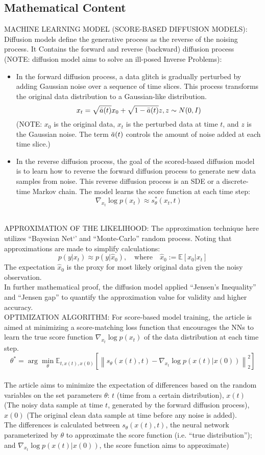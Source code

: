 \documentclass[12pt]{article}
\begin{document}
\subsection*{Mathematical Content}
MACHINE LEARNING MODEL (SCORE-BASED DIFFUSION MODELS):
Diffusion models define the generative process as the reverse of the noising process. It Contains the forward and reverse (backward) diffusion process (NOTE: diffusion model aims to solve an ill-posed Inverse Problems):
\begin{itemize}
    \item In the forward diffusion process, a data glitch is gradually perturbed by adding Gaussian noise over a sequence of time slices. This process transforms the original data distribution to a Gaussian-like distribution.
    \[ x_t = \sqrt{\Bar{a}(t)}x_0 + \sqrt{1 - \Bar{a}(t)}z, z \sim N(0, I) \]
    (NOTE: $x_0$ is the original data, $x_t$ is the perturbed data at time $t$, and $z$ is the Gaussian noise. The term $\Bar{a}(t)$ controls the amount of noise added at each time slice.)
    \item In the reverse diffusion process, the goal of the scored-based diffusion model is to learn how to reverse the forward diffusion process to generate new data samples from noise. This reverse diffusion process is an SDE or a discrete-time Markov chain. The model learns the score function at each time step:
    \[ \nabla_{x_t} \log p(x_t) \approx s_{\theta}^*(x_t, t) \]
\end{itemize}
\\
APPROXIMATION OF THE LIKELIHOOD:
The approximation technique here utilizes ``Bayesian Net‘’ and ``Monte-Carlo'' random process. Noting that approximations are made to simplify calculations:
\[ p(y|x_t) \approx p(y|\hat{x}_0), \quad \text{where} \quad \hat{x}_0 := \mathbb{E}[x_0 | x_t] \]
The expectation $\hat{x}_0$ is the proxy for most likely original data given the noisy observation. 
\\
In further mathematical proof, the diffusion model applied ``Jensen's Inequality'' and ``Jensen gap'' to quantify the approximation value for validity and higher accuracy.
\\
OPTIMIZATION ALGORITHM:
For score-based model training, the article is aimed at minimizing a score-matching loss function that encourages the NNs to learn the true score function \( \nabla_{x_t} \log p(x_t) \) of the data distribution at each time step. 
\\
\[ \theta^* = \arg\min_{\theta} \mathbb{E}_{t, x(t), x(0)} \left[ \left\| s_{\theta}(x(t), t) - \nabla_{x_t} \log p(x(t) | x(0)) \right\|_2^2 \right] \]
\\
The article aims to minimize the expectation of differences based on the random variables on the set parameters $\theta$: $t$ (time from a certain distribution), $x(t)$ (The noisy data sample at time $t$, generated by the forward diffusion process), $x(0)$ (The original clean data sample at time before any noise is added). 
\\
The differences is calculated between $s_{\theta}(x(t),t)$, the neural network parameterized by $\theta$ to approximate the score function (i.e. ``true distribution''); and $\nabla_{x_t} \log p(x(t) | x(0))$, the score function aims to approximate)
\end{document}
